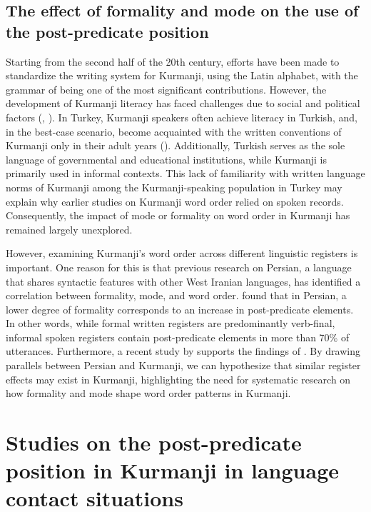 \subsection{The effect of formality and mode on the use of the post-predicate position} \label{sec:key:3.3.4}

Starting from the second half of the 20th century, efforts have been made to standardize the writing system for Kurmanji, using the Latin alphabet, with the grammar of \citet{KhanLescot1970} being one of the most significant contributions. However, the development of Kurmanji literacy has faced challenges due to social and political factors (\citealt{Derince2013}, \citealt{BrizicnodateEtAl}). In Turkey, Kurmanji speakers often achieve literacy in Turkish, and, in the best-case scenario, become acquainted with the written conventions of Kurmanji only in their adult years (\citealt{HaigMatras2002}). Additionally, Turkish serves as the sole language of governmental and educational institutions, while Kurmanji is primarily used in informal contexts. This lack of familiarity with written language norms of Kurmanji among the Kurmanji-speaking population in Turkey may explain why earlier studies on Kurmanji word order relied on spoken records. Consequently, the impact of mode or formality on word order in Kurmanji has remained largely unexplored.

However, examining Kurmanji's word order across different linguistic registers is important. One reason for this is that previous research on Persian, a language that shares syntactic features with other West Iranian languages, has identified a correlation between formality, mode, and word order. \citet{Frommer1981} found that in Persian, a lower degree of formality corresponds to an increase in post-predicate elements. In other words, while formal written registers are predominantly verb-final, informal spoken registers contain post-predicate elements in more than 70\% of utterances. Furthermore, a recent study by \citet{Haig_post-predicate_EtAl2024-1} supports the findings of \citet{Frommer1981}. By drawing parallels between Persian and Kurmanji, we can hypothesize that similar register effects may exist in Kurmanji, highlighting the need for systematic research on how formality and mode shape word order patterns in Kurmanji.

\section{Studies on the post-predicate position in Kurmanji in language contact situations} \label{sec:key:3.4}

